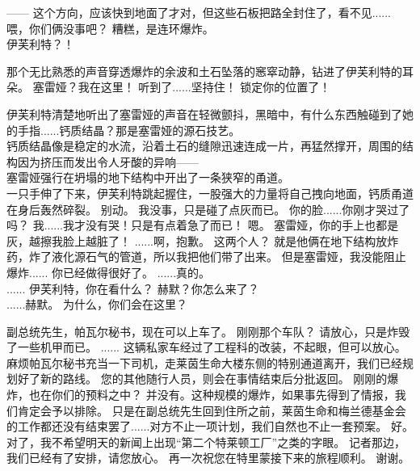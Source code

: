 \documentclass[openany]{book}
\begin{document}
\begin{dialogue}
     ——
     这个方向，应该快到地面了才对，但这些石板把路全封住了，看不见......
     喂，你们俩没事吧？
     糟糕，是连环爆炸。
    \\
     伊芙利特？！\par
    那个无比熟悉的声音穿透爆炸的余波和土石坠落的窸窣动静，钻进了伊芙利特的耳朵。
     塞雷娅？我在这里！
     听到了......坚持住！
     锁定你的位置了！\par
    伊芙利特清楚地听出了塞雷娅的声音在轻微颤抖，黑暗中，有什么东西触碰到了她的手指......钙质结晶？那是塞雷娅的源石技艺。\\
    钙质结晶像是稳定的水流，沿着土石的缝隙迅速连成一片，再猛然撑开，周围的结构因为挤压而发出令人牙酸的异响——\\
    塞雷娅强行在坍塌的地下结构中开出了一条狭窄的甬道。\\
    一只手伸了下来，伊芙利特跳起握住，一股强大的力量将自己拽向地面，钙质甬道在身后轰然碎裂。
     别动。
     我没事，只是碰了点灰而已。
     你的脸......你刚才哭过了吗？
     我......我才没有哭！只是有点着急了而已！
     嗯。
     塞雷娅，你的手上也都是灰，越擦我脸上越脏了！
     ......啊，抱歉。
     这两个人？
     就是他俩在地下结构放炸药，炸了液化源石气的管道，所以我把他们带了出来。
     但是塞雷娅，我没能阻止爆炸......
     你已经做得很好了。
     ......真的。
    \\
     ......
     伊芙利特，你在看什么？
     赫默？你怎么来了？
    \\
     ......赫默。
     为什么，你们会在这里？
\end{dialogue}

\begin{dialogue}
     副总统先生，帕瓦尔秘书，现在可以上车了。
     刚刚那个车队？
     请放心，只是炸毁了一些机甲而已。
     ......
     这辆私家车经过了工程科的改装，不起眼，但可以放心。
     麻烦帕瓦尔秘书充当一下司机，走莱茵生命大楼东侧的特别通道离开，我们已经规划好了新的路线。
     您的其他随行人员，则会在事情结束后分批返回。
     刚刚的爆炸，也在你们的预料之中？
     并没有。这种规模的爆炸，如果事先得到了情报，我们肯定会予以排除。
     只是在副总统先生回到住所之前，莱茵生命和梅兰德基金会的工作都还没有结束罢了......对方不止一项计划，我们自然也不止一套预案。
     好。
     对了，我不希望明天的新闻上出现“第二个特莱顿工厂”之类的字眼。
     记者那边，我们已经有了安排，请您放心。
     再一次祝您在特里蒙接下来的旅程顺利。
     谢谢。
\end{dialogue}
\end{document}

